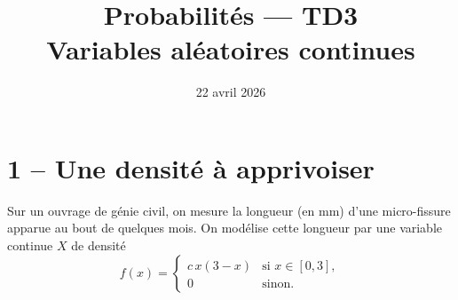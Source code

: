 


\title{\sffamily\bfseries Probabilités --- TD3\\[0.3em]
  \Large Variables aléatoires continues}
\author{}
\date{22 avril 2026}


\sffamily
\maketitle


\section*{1 -- Une densité à apprivoiser}

Sur un ouvrage de génie civil, on mesure la longueur (en mm) d'une
micro-fissure apparue au bout de quelques mois.
On modélise cette longueur par une variable continue $X$ de densité
\[
  f(x)=
  \begin{cases}
    c\,x(3-x) & \text{si } x\in[0,3],\\
    0 & \text{sinon.}
  \end{cases}
\]

